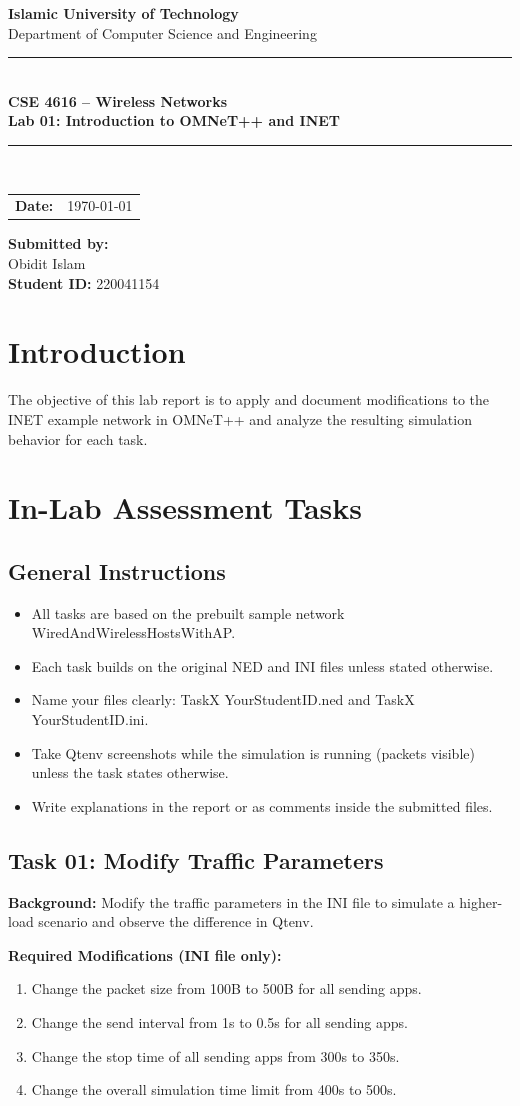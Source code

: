 \documentclass[12pt]{article}
\newcommand{\maketitlepage}{
    \begin{titlepage}
        \centering
        \vspace*{1.5cm}

        {\Huge \textbf{Islamic University of Technology}}\\[12pt]
        {\Large Department of Computer Science and Engineering}\\[25pt]

        \rule{0.85\textwidth}{0.6pt} \\[14pt]

        {\LARGE \textbf{CSE 4616 -- Wireless Networks}}\\[8pt]
        {\Large \textbf{Lab 01: Introduction to OMNeT++ and INET}}\\[6pt]

        \rule{0.85\textwidth}{0.6pt} \\[40pt]

        \begin{tabular}{rl}
            \textbf{Date:} & \today
        \end{tabular}

        \vspace{4cm}

        \hfill
        \begin{minipage}{0.50\textwidth}
            \raggedleft
            \textbf{Submitted by:} \\
            Obidit Islam \\
            \textbf{Student ID:} 220041154
        \end{minipage}

        \vfill
    \end{titlepage}
}
\begin{document}
\maketitlepage

\section{Introduction}
The objective of this lab report is to apply and document modifications to the INET example network in OMNeT++ and analyze the resulting simulation behavior for each task.

\section{In-Lab Assessment Tasks}
\subsection{General Instructions}
\begin{itemize}
    \item All tasks are based on the prebuilt sample network WiredAndWirelessHostsWithAP.
    \item Each task builds on the original NED and INI files unless stated otherwise.
    \item Name your files clearly: TaskX YourStudentID.ned and TaskX YourStudentID.ini.
    \item Take Qtenv screenshots while the simulation is running (packets visible) unless the task states otherwise.
    \item Write explanations in the report or as comments inside the submitted files.
\end{itemize}

\subsection{Task 01: Modify Traffic Parameters}
\textbf{Background:} Modify the traffic parameters in the INI file to simulate a higher-load scenario and observe the difference in Qtenv.

\textbf{Required Modifications (INI file only):}
\begin{enumerate}
    \item Change the packet size from 100B to 500B for all sending apps.
    \item Change the send interval from 1s to 0.5s for all sending apps.
    \item Change the stop time of all sending apps from 300s to 350s.
    \item Change the overall simulation time limit from 400s to 500s.
\end{enumerate}
\end{document}
